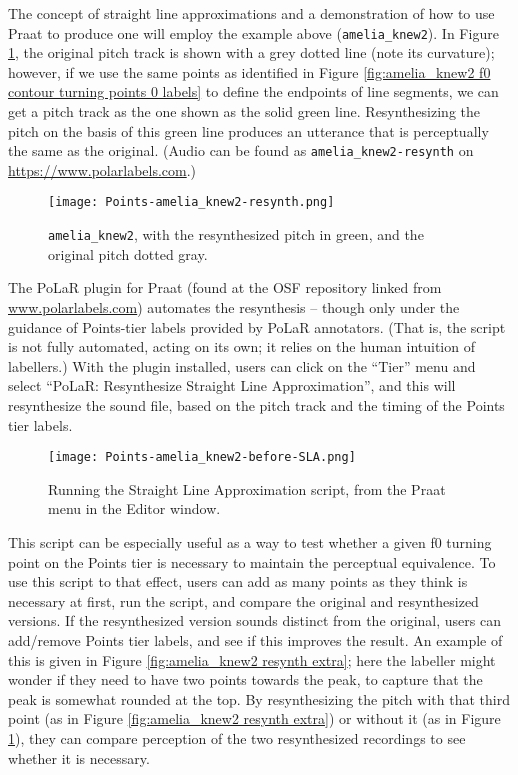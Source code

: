 The concept of straight line approximations and a demonstration of how to use Praat to produce one will employ the example above (\texttt{amelia\_knew2}). In Figure \ref{fig:amelia_knew2 resynth}, the original pitch track is shown with a grey dotted line (note its curvature); however, if we use the same points as identified in Figure \ref{fig:amelia_knew2 f0 contour turning points 0 labels} to define the endpoints of line segments, we can get a pitch track as the one shown as the solid green line. Resynthesizing the pitch on the basis of this green line produces an utterance that is perceptually the same as the original. (Audio can be found as \texttt{amelia\_knew2-resynth} on \url{https://www.polarlabels.com}.)

\begin{figure}[H]
\centering
%
\texttt{[image: Points-amelia\_knew2-resynth.png]}
%
\caption{\texttt{amelia\_knew2}, with the resynthesized pitch in green, and the original pitch dotted gray.%
\label{fig:amelia_knew2 resynth}%
}
\end{figure}

The PoLaR plugin for Praat (found at the OSF repository linked from \href{https://www.polarlabels.com}{www.polarlabels.com}) automates the resynthesis – though only under the guidance of Points-tier labels provided by PoLaR annotators. (That is, the script is not fully automated, acting on its own; it relies on the human intuition of labellers.) With the plugin installed, users can click on the “Tier” menu and select “PoLaR: Resynthesize Straight Line Approximation”, and this will resynthesize the sound file, based on the pitch track and the timing of the Points tier labels.

\begin{figure}[H]
\centering
%
\texttt{[image: Points-amelia\_knew2-before-SLA.png]}
%
\caption{Running the Straight Line Approximation script, from the Praat menu in the Editor window.%
\label{fig:amelia_knew2 SLA menu}%
}
\end{figure}

This script can be especially useful as a way to test whether a given f0 turning point on the Points tier is necessary to maintain the perceptual equivalence. To use this script to that effect, users can add as many points as they think is necessary at first, run the script, and compare the original and resynthesized versions. If the resynthesized version sounds distinct from the original, users can add\slash remove Points tier labels, and see if this improves the result. An example of this is given in Figure \ref{fig:amelia_knew2 resynth extra}; here the labeller might wonder if they need to have two points towards the peak, to capture that the peak is somewhat rounded at the top. By resynthesizing the pitch with that third point (as in Figure \ref{fig:amelia_knew2 resynth extra}) or without it (as in Figure \ref{fig:amelia_knew2 resynth}), they can compare perception of the two resynthesized recordings to see whether it is necessary.

